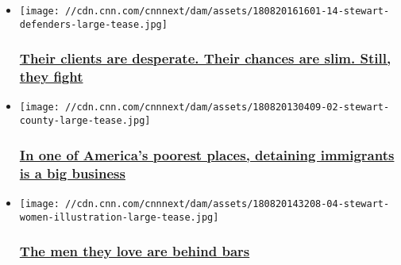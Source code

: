 \begin{itemize}
\item
  \href{http://www.cnn.com/interactive/2018/08/us/ice-detention-stewart-georgia/?utm_content=chapter_02}{}

  \texttt{[image: //cdn.cnn.com/cnnnext/dam/assets/180820161601-14-stewart-defenders-large-tease.jpg]}

  \hypertarget{their-clients-are-desperate-their-chances-are-slim-still-they-fight}{%
  \subsubsection{\texorpdfstring{\href{http://www.cnn.com/interactive/2018/08/us/ice-detention-stewart-georgia/?utm_content=chapter_02}{Their
  clients are desperate. Their chances are slim. Still, they
  fight}}{Their clients are desperate. Their chances are slim. Still, they fight}}\label{their-clients-are-desperate-their-chances-are-slim-still-they-fight}}
\item
  \href{http://www.cnn.com/interactive/2018/08/us/ice-detention-stewart-georgia/?utm_content=chapter_04}{}

  \texttt{[image: //cdn.cnn.com/cnnnext/dam/assets/180820130409-02-stewart-county-large-tease.jpg]}

  \hypertarget{in-one-of-americas-poorest-places-detaining-immigrants-is-a-big-business}{%
  \subsubsection{\texorpdfstring{\href{http://www.cnn.com/interactive/2018/08/us/ice-detention-stewart-georgia/?utm_content=chapter_04}{In
  one of America's poorest places, detaining immigrants is a big
  business}}{In one of America's poorest places, detaining immigrants is a big business}}\label{in-one-of-americas-poorest-places-detaining-immigrants-is-a-big-business}}
\item
  \href{https://www.cnn.com/interactive/2018/08/us/ice-detention-stewart-georgia/?utm_content=chapter_03}{}

  \texttt{[image: //cdn.cnn.com/cnnnext/dam/assets/180820143208-04-stewart-women-illustration-large-tease.jpg]}

  \hypertarget{the-men-they-love-are-behind-bars}{%
  \subsubsection{\texorpdfstring{\href{https://www.cnn.com/interactive/2018/08/us/ice-detention-stewart-georgia/?utm_content=chapter_03}{The
  men they love are behind
  bars}}{The men they love are behind bars}}\label{the-men-they-love-are-behind-bars}}
\end{itemize}

